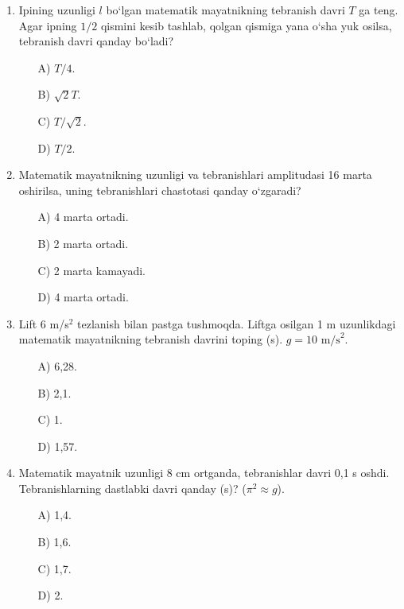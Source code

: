\begin{enumerate}
\begin{itemize}
    \end{itemize}

    \item Ipining uzunligi $l$ bo‘lgan matematik mayatnikning tebranish davri $T$ ga teng. Agar ipning $1/2$ qismini kesib tashlab, qolgan qismiga yana o‘sha yuk osilsa, tebranish davri qanday bo‘ladi?
    \begin{itemize}
        \item[A)] $T/4$.
        \item[B)] $\sqrt{2}T$.
        \item[C)] $T/\sqrt{2}$.
        \item[D)] $T/2$.
        
    \end{itemize}

    \item Matematik mayatnikning uzunligi va tebranishlari amplitudasi 16 marta oshirilsa, uning tebranishlari chastotasi qanday o‘zgaradi?
    \begin{itemize}
        \item[A)] 4 marta ortadi.
        \item[B)] 2 marta ortadi.
        \item[C)] 2 marta kamayadi.
        \item[D)] 4 marta ortadi.
        
    \end{itemize}

    \item Lift 6 m/s$^2$ tezlanish bilan pastga tushmoqda. Liftga osilgan 1 m uzunlikdagi matematik mayatnikning tebranish davrini toping (s). $g=10 \text{ m/s}^2$.
    \begin{itemize}
        \item[A)] 6,28.
        \item[B)] 2,1.
        \item[C)] 1.
        
        \item[D)] 1,57.
    \end{itemize}

    \item Matematik mayatnik uzunligi 8 cm ortganda, tebranishlar davri 0,1 s oshdi. Tebranishlarning dastlabki davri qanday (s)? ($\pi^2 \approx g$).
    \begin{itemize}
        \item[A)] 1,4.
        \item[B)] 1,6.
        \item[C)] 1,7.
        \item[D)] 2.
        

\end{itemize}
\end{enumerate}
